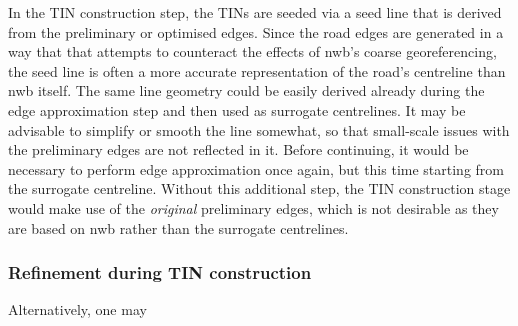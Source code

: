 In the TIN construction step, the TINs are seeded via a seed line that is derived from the preliminary or optimised edges. Since the road edges are generated in a way that that attempts to counteract the effects of \ac{nwb}'s coarse georeferencing, the seed line is often a more accurate representation of the road's centreline than \ac{nwb} itself. The same line geometry could be easily derived already during the edge approximation step and then used as surrogate centrelines. It may be advisable to simplify or smooth the line somewhat, so that small-scale issues with the preliminary edges are not reflected in it. Before continuing, it would be necessary to perform edge approximation once again, but this time starting from the surrogate centreline. Without this additional step, the TIN construction stage would make use of the \textit{original} preliminary edges, which is not desirable as they are based on \ac{nwb} rather than the surrogate centrelines.

\subsubsection{Refinement during TIN construction}

Alternatively, one may 